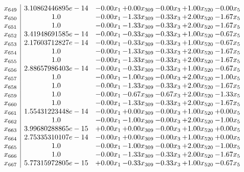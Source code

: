 \documentclass[8pt]{article}
\begin{document}
\[\begin{array}{c| c c@{\hskip 2pt} c@{\hskip 2pt} c@{\hskip 2pt} c@{\hskip 2pt} c@{\hskip 2pt} }
 x_{649}   &  3.10862446895e-14 & -0.00 x_{1} & +  0.00 x_{309} & -0.00 x_{3} & +  1.00 x_{520} & -0.00 x_{5}\\
 x_{650}   &  1.0 & -0.00 x_{1} & -1.33 x_{309} & -0.33 x_{3} & +  2.00 x_{520} & -1.67 x_{5}\\
 x_{651}   &  1.0 & -0.00 x_{1} & -1.33 x_{309} & -0.33 x_{3} & +  2.00 x_{520} & -1.67 x_{5}\\
 x_{652}   &  3.41948691585e-14 & -0.00 x_{1} & -0.33 x_{309} & -0.33 x_{3} & +  1.00 x_{520} & -0.67 x_{5}\\
 x_{653}   &  2.17603712827e-14 & -0.00 x_{1} & -0.33 x_{309} & -0.33 x_{3} & +  1.00 x_{520} & -0.67 x_{5}\\
 x_{654}   &  1.0 & -0.00 x_{1} & -1.33 x_{309} & -0.33 x_{3} & +  2.00 x_{520} & -1.67 x_{5}\\
 x_{655}   &  1.0 & -0.00 x_{1} & -1.33 x_{309} & -0.33 x_{3} & +  2.00 x_{520} & -1.67 x_{5}\\
 x_{656}   &  2.88657986403e-14 & -0.00 x_{1} & -0.33 x_{309} & -0.33 x_{3} & +  1.00 x_{520} & -0.67 x_{5}\\
 x_{657}   &  1.0 & -0.00 x_{1} & -1.00 x_{309} & -0.00 x_{3} & +  2.00 x_{520} & -1.00 x_{5}\\
 x_{658}   &  1.0 & -0.00 x_{1} & -1.33 x_{309} & -0.33 x_{3} & +  2.00 x_{520} & -1.67 x_{5}\\
 x_{659}   &  1.0 & -0.00 x_{1} & -0.67 x_{309} & -0.67 x_{3} & +  2.00 x_{520} & -1.33 x_{5}\\
 x_{660}   &  1.0 & -0.00 x_{1} & -1.33 x_{309} & -0.33 x_{3} & +  2.00 x_{520} & -1.67 x_{5}\\
 x_{661}   &  1.55431223448e-14 & -0.00 x_{1} & +  0.00 x_{309} & -0.00 x_{3} & +  1.00 x_{520} & +  0.00 x_{5}\\
 x_{662}   &  1.0 & -0.00 x_{1} & -1.00 x_{309} & -0.00 x_{3} & +  2.00 x_{520} & -1.00 x_{5}\\
 x_{663}   &  3.99680288865e-15 & +  0.00 x_{1} & +  0.00 x_{309} & -0.00 x_{3} & +  1.00 x_{520} & +  0.00 x_{5}\\
 x_{664}   &  2.75335310107e-14 & -0.00 x_{1} & +  0.00 x_{309} & -0.00 x_{3} & +  1.00 x_{520} & +  0.00 x_{5}\\
 x_{665}   &  1.0 & -0.00 x_{1} & -1.00 x_{309} & -0.00 x_{3} & +  2.00 x_{520} & -1.00 x_{5}\\
 x_{666}   &  1.0 & -0.00 x_{1} & -1.33 x_{309} & -0.33 x_{3} & +  2.00 x_{520} & -1.67 x_{5}\\
 x_{667}   &  5.77315972805e-15 & +  0.00 x_{1} & -0.33 x_{309} & -0.33 x_{3} & +  1.00 x_{520} & -0.67 x_{5}\\

\end{array}\]
\end{document}
